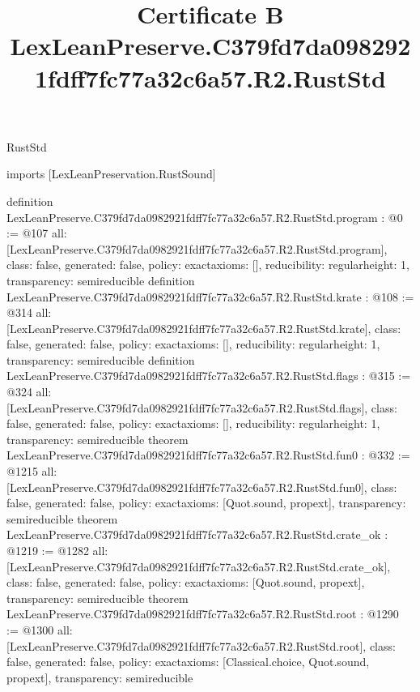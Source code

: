 \begin{lexlean}{RustStd}
\title{Certificate B LexLeanPreserve.C379fd7da0982921fdff7fc77a32c6a57.R2.RustStd}
\begin{coremodule}
imports [LexLeanPreservation.RustSound]

definition LexLeanPreserve.C379fd7da0982921fdff7fc77a32c6a57.R2.RustStd.program : @0 := @107 {
  all: [LexLeanPreserve.C379fd7da0982921fdff7fc77a32c6a57.R2.RustStd.program],
  class: false,
  generated: false,
  policy: exact{axioms: []},
  reducibility: regular{height: 1},
  transparency: semireducible
}
definition LexLeanPreserve.C379fd7da0982921fdff7fc77a32c6a57.R2.RustStd.krate : @108 := @314 {
  all: [LexLeanPreserve.C379fd7da0982921fdff7fc77a32c6a57.R2.RustStd.krate],
  class: false,
  generated: false,
  policy: exact{axioms: []},
  reducibility: regular{height: 1},
  transparency: semireducible
}
definition LexLeanPreserve.C379fd7da0982921fdff7fc77a32c6a57.R2.RustStd.flags : @315 := @324 {
  all: [LexLeanPreserve.C379fd7da0982921fdff7fc77a32c6a57.R2.RustStd.flags],
  class: false,
  generated: false,
  policy: exact{axioms: []},
  reducibility: regular{height: 1},
  transparency: semireducible
}
theorem LexLeanPreserve.C379fd7da0982921fdff7fc77a32c6a57.R2.RustStd.fun0 : @332 := @1215 {
  all: [LexLeanPreserve.C379fd7da0982921fdff7fc77a32c6a57.R2.RustStd.fun0],
  class: false,
  generated: false,
  policy: exact{axioms: [Quot.sound, propext]},
  transparency: semireducible
}
theorem LexLeanPreserve.C379fd7da0982921fdff7fc77a32c6a57.R2.RustStd.crate_ok : @1219 := @1282 {
  all: [LexLeanPreserve.C379fd7da0982921fdff7fc77a32c6a57.R2.RustStd.crate_ok],
  class: false,
  generated: false,
  policy: exact{axioms: [Quot.sound, propext]},
  transparency: semireducible
}
theorem LexLeanPreserve.C379fd7da0982921fdff7fc77a32c6a57.R2.RustStd.root : @1290 := @1300 {
  all: [LexLeanPreserve.C379fd7da0982921fdff7fc77a32c6a57.R2.RustStd.root],
  class: false,
  generated: false,
  policy: exact{axioms: [Classical.choice, Quot.sound, propext]},
  transparency: semireducible
}


\end{coremodule}
\end{lexlean}
